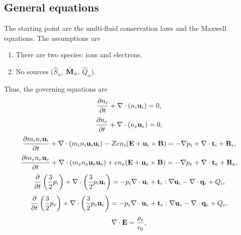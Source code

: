 \documentclass[a4paper,11pt]{report}
\begin{document}
\subsection{General equations}
\label{sec:two_fluid_equations}
The starting point are the multi-fluid conservation laws and the Maxwell equations. The assumptions are
\begin{enumerate}
    \item There are two species: ions and electrons.
    \item No sources ($\hat{S}_\alpha$, $\hat{\mathbf{M}}_\alpha$, $\hat{Q}_\alpha$).
\end{enumerate}
Thus, the governing equations are
\begin{equation}
    \label{eq:twof_ni}
    \frac{\partial n_i}{\partial t} + \nabla \cdot \left ( n_i \mathbf{u}_i \right ) = 0,
\end{equation}
\begin{equation}
    \label{eq:twof_ne}
    \frac{\partial n_e}{\partial t} + \nabla \cdot \left ( n_e \mathbf{u}_e \right ) = 0,
\end{equation}
\begin{equation}
    \label{eq:twof_ui}
    \frac{\partial m_i n_i \mathbf{u}_i}{\partial t} + \nabla \cdot \left ( m_i n_i \mathbf{u}_i \mathbf{u}_i \right) - Z e n_i ( \mathbf{E} + \mathbf{u}_i \times \mathbf{B} ) = - \nabla p_i + \nabla \cdot \mathbf{t}_i + \mathbf{R}_i,
\end{equation}
\begin{equation}
    \label{eq:twof_ue}
    \frac{\partial m_e n_e \mathbf{u}_e}{\partial t} + \nabla \cdot \left ( m_e n_e \mathbf{u}_e \mathbf{u}_e \right) + e n_e ( \mathbf{E} + \mathbf{u}_e \times \mathbf{B} ) = - \nabla p_e + \nabla \cdot \mathbf{t}_e + \mathbf{R}_e,
\end{equation}
\begin{equation}
    \label{eq:twof_iei}
    \frac{\partial}{\partial t} \left ( \frac{3}{2} p_i \right ) + \nabla \cdot \left ( \frac{3}{2} p_i \mathbf{u}_i \right ) = -p_i \nabla \cdot \mathbf{u}_i + \mathbf{t}_i : \nabla \mathbf{u}_i - \nabla \cdot \mathbf{q}_i + Q_i,
\end{equation}
\begin{equation}
    \label{eq:twof_iee}
    \frac{\partial}{\partial t} \left ( \frac{3}{2} p_e \right ) + \nabla \cdot \left ( \frac{3}{2} p_e \mathbf{u}_e \right ) = -p_e \nabla \cdot \mathbf{u}_e + \mathbf{t}_e : \nabla \mathbf{u}_e - \nabla \cdot \mathbf{q}_e + Q_e,
\end{equation}
\begin{equation}
    \label{eq:twof_maxwell_3}
    \nabla \cdot \mathbf{E} = \frac{\rho_e}{\epsilon_0},
\end{equation}
\end{document}
